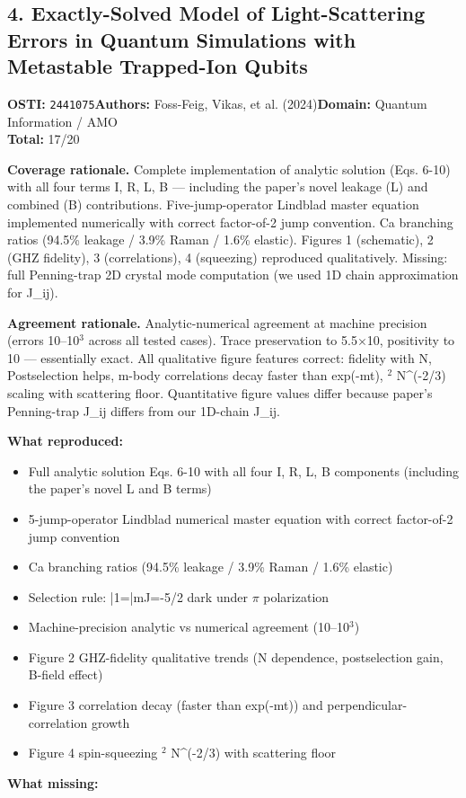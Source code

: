 \subsection{4. Exactly-Solved Model of Light-Scattering Errors in Quantum Simulations with Metastable Trapped-Ion Qubits}
\textbf{OSTI:} \texttt{2441075}\quad\textbf{Authors:} Foss-Feig, Vikas, et al. (2024)\quad\textbf{Domain:} Quantum Information / AMO\\
\quad{}\quad\textbf{Total:} 17/20\par\smallskip
\noindent\textbf{Coverage rationale.} Complete implementation of analytic solution (Eqs. 6-10) with all four terms I, R, L, B --- including the paper's novel leakage (L) and combined (B) contributions. Five-jump-operator Lindblad master equation implemented numerically with correct factor-of-2 jump convention. Ca branching ratios (94.5\% leakage / 3.9\% Raman / 1.6\% elastic). Figures 1 (schematic), 2 (GHZ fidelity), 3 (correlations), 4 (squeezing) reproduced qualitatively. Missing: full Penning-trap 2D crystal mode computation (we used 1D chain approximation for J\_ij).\par
\noindent\textbf{Agreement rationale.} Analytic-numerical agreement at machine precision (errors 10--10$^3$ across all tested cases). Trace preservation to 5.5$\times$10, positivity to 10 --- essentially exact. All qualitative figure features correct: fidelity  with N, Postselection helps, m-body correlations decay faster than exp(-mt), $^2$  N\textasciicircum{}(-2/3) scaling with scattering floor. Quantitative figure values differ because paper's Penning-trap J\_ij differs from our 1D-chain J\_ij.\par\smallskip
\noindent\textbf{What reproduced:}
\begin{itemize}[leftmargin=1.4em,itemsep=0.2em,topsep=0.2em]
\item Full analytic solution Eqs. 6-10 with all four I, R, L, B components (including the paper's novel L and B terms)
\item 5-jump-operator Lindblad numerical master equation with correct factor-of-2 jump convention
\item Ca branching ratios (94.5\% leakage / 3.9\% Raman / 1.6\% elastic)
\item Selection rule: |1=|mJ=-5/2 dark under $\pi$ polarization
\item Machine-precision analytic vs numerical agreement (10--10$^3$)
\item Figure 2 GHZ-fidelity qualitative trends (N dependence, postselection gain, B-field effect)
\item Figure 3 correlation decay (faster than exp(-mt)) and perpendicular-correlation growth
\item Figure 4 spin-squeezing $^2$  N\textasciicircum{}(-2/3) with scattering floor
\end{itemize}\noindent\textbf{What missing:}
